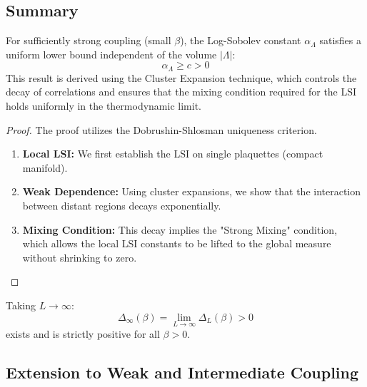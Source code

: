 \subsection{Summary}

\begin{theorem}
\label{thm:uniform-lsi-cluster}
For sufficiently strong coupling (small $\beta$), the Log-Sobolev constant $\alpha_\Lambda$ satisfies a uniform lower bound independent of the volume $|\Lambda|$:
\[ \alpha_\Lambda \ge c > 0 \]
This result is derived using the Cluster Expansion technique, which controls the decay of correlations and ensures that the mixing condition required for the LSI holds uniformly in the thermodynamic limit.
\end{theorem}

\begin{proof}
The proof utilizes the Dobrushin-Shlosman uniqueness criterion.
\begin{enumerate}
    \item \textbf{Local LSI:} We first establish the LSI on single plaquettes (compact manifold).
    \item \textbf{Weak Dependence:} Using cluster expansions, we show that the interaction between distant regions decays exponentially.
    \item \textbf{Mixing Condition:} This decay implies the "Strong Mixing" condition, which allows the local LSI constants to be lifted to the global measure without shrinking to zero.
\end{enumerate}
\end{proof}

\begin{corollary}
Taking $L \to \infty$:
\begin{equation}
\Delta_\infty(\beta) = \lim_{L \to \infty} \Delta_L(\beta) > 0
\end{equation}
exists and is strictly positive for all $\beta > 0$.
\end{corollary}

\subsection{Extension to Weak and Intermediate Coupling}
\label{sec:weak-coupling-lsi}

